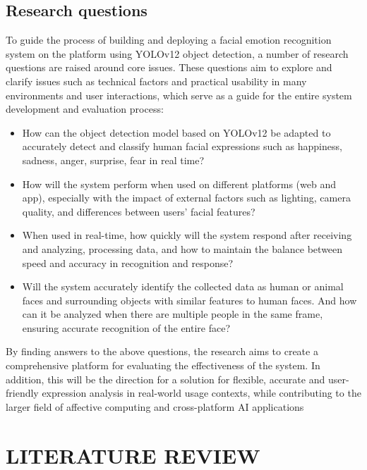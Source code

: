 \documentclass[a4paper,13pt]{report}
\begin{document}
\section{Research questions}
To guide the process of building and deploying a facial emotion recognition system on the platform using YOLOv12 object detection, a number of research questions are raised around core issues. These questions aim to explore and clarify issues such as technical factors and practical usability in many environments and user interactions, which serve as a guide for the entire system development and evaluation process:

\begin{itemize}
\item How can the object detection model based on YOLOv12 be adapted to accurately detect and classify human facial expressions such as happiness, sadness, anger, surprise, fear in real time?
\item How will the system perform when used on different platforms (web and app), especially with the impact of external factors such as lighting, camera quality, and differences between users' facial features?
\item When used in real-time, how quickly will the system respond after receiving and analyzing, processing data, and how to maintain the balance between speed and accuracy in recognition and response?
\item Will the system accurately identify the collected data as human or animal faces and surrounding objects with similar features to human faces. And how can it be analyzed when there are multiple people in the same frame, ensuring accurate recognition of the entire face?
\end{itemize}

By finding answers to the above questions, the research aims to create a comprehensive platform for evaluating the effectiveness of the system. In addition, this will be the direction for a solution for flexible, accurate and user-friendly expression analysis in real-world usage contexts, while contributing to the larger field of affective computing and cross-platform AI applications

\clearpage
\chapter{LITERATURE REVIEW}
\end{document}
